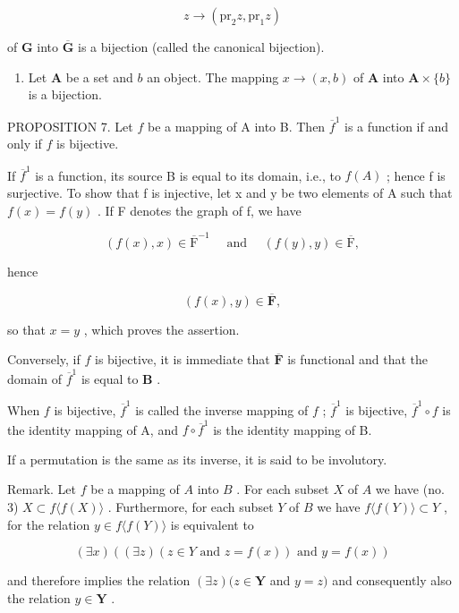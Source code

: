 \[
z \rightarrow (\mathrm{pr} _ {2} z, \mathrm{pr} _ {1} z)
\]

of \(\mathbf{G}\) into \(\overline{\mathbf{G}}\) is a bijection (called the canonical bijection).

\begin{enumerate}
\def\labelenumi{(\arabic{enumi})}
\setcounter{enumi}{4}
\tightlist
\item
  Let \(\mathbf{A}\) be a set and \(b\) an object. The mapping \(x \to (x, b)\) of \(\mathbf{A}\) into \(\mathbf{A} \times \{b\}\) is a bijection.
\end{enumerate}

PROPOSITION 7. Let \(f\) be a mapping of A into B. Then \(\overline{f}^1\) is a function if and only if \(f\) is bijective.

If \(\overline{f}^{1}\) is a function, its source B is equal to its domain, i.e., to \(f(A)\) ; hence f is surjective. To show that f is injective, let x and y be two elements of A such that \(f(x)=f(y)\) . If F denotes the graph of f, we have

\[
(f (x), x) \in \overline {{\mathrm{F}}} ^ {- 1} \quad \text { and } \quad (f (y), y) \in \overline {{\mathrm{F}}},
\]

hence

\[
(f (x), y) \in \overline {{\mathbf {F}}},
\]

so that \(x = y\) , which proves the assertion.

Conversely, if \(f\) is bijective, it is immediate that \(\overline{\mathbf{F}}\) is functional and that the domain of \(\overline{f}^1\) is equal to \(\mathbf{B}\) .

When \(f\) is bijective, \(\overline{f}^1\) is called the inverse mapping of \(f\) ; \(\overline{f}^1\) is bijective, \(\overline{f}^1 \circ f\) is the identity mapping of A, and \(f \circ \overline{f}^1\) is the identity mapping of B.

If a permutation is the same as its inverse, it is said to be involutory.

Remark. Let \(f\) be a mapping of \(A\) into \(B\) . For each subset \(X\) of \(A\) we have (no. 3) \(X \subset f\langle f(X)\rangle\) . Furthermore, for each subset \(Y\) of \(B\) we have \(f\langle f(Y)\rangle \subset Y\) , for the relation \(y \in f\langle f(Y)\rangle\) is equivalent to

\[
(\exists x) ((\exists z) (z \in Y \text { and } z = f (x)) \text { and } y = f (x))
\]

and therefore implies the relation \((\exists z)(z \in \mathbf{Y}\) and \(y = z)\) and consequently also the relation \(y \in \mathbf{Y}\) .

